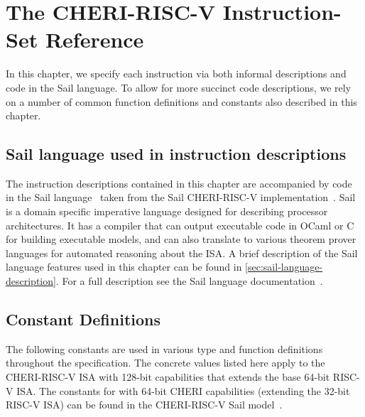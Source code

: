 \chapter{The CHERI-RISC-V Instruction-Set Reference}
\label{chap:isaref-riscv}


\def\rvcheriasminsnref#1{#1}
\def\rvcheriasminsnnoref#1{#1}
\providecommand{\rvcheriasmfmt}{}
\renewcommand{\rvcheriasmfmt}[2][]{%
  #2%
  \ifthenelse{\equal{#1}{}}{%
  }{%
    ~{\textit{\footnotesize{(#1)}}}%
  }%
}

In this chapter, we specify each instruction via both informal descriptions
and code in the Sail language.
To allow for more succinct code descriptions, we rely on a number of
common function definitions and constants also described in this chapter.

\section{Sail language used in instruction descriptions}
The instruction descriptions contained in this chapter are accompanied
by code in the Sail language~\cite{sail-popl2019,sail-url} taken from the Sail
CHERI-RISC-V implementation~\cite{sail-cheri-riscv}.
Sail is a domain specific imperative language designed for describing
processor architectures.  It has a compiler that can output executable
code in OCaml or C for building executable models, and can also
translate to various theorem prover languages for automated reasoning
about the ISA.
A brief description of the Sail language features used in this chapter can be
found in \cref{sec:sail-language-description}.
For a full description see the Sail language documentation~\cite{sail-url}.

\section{Constant Definitions}
The following constants are used in various type and function definitions throughout the specification.
The concrete values listed here apply to the CHERI-RISC-V ISA with
128-bit capabilities that extends the base 64-bit RISC-V ISA.
The constants for with 64-bit CHERI capabilities (extending the 32-bit RISC-V ISA)
can be found in the CHERI-RISC-V Sail model~\cite{sail-cheri-riscv}.

\medskip
\label{sailRISCVzxlen}
\sailRISCVtypecapAddrWidth{}
\sailRISCVtypecapLenWidth{}
\sailRISCVtypecapSizze{}
\sailRISCVtypecapMantissaWidth{}


